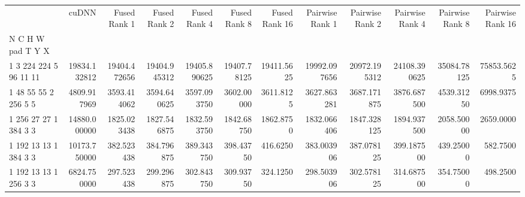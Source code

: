 \begin{tabular}{lrrrrrrrrrrr}
\toprule
{} &         cuDNN &   Fused Rank 1 &   Fused Rank 2 &   Fused Rank 4 &   Fused Rank 8 &   Fused Rank 16 &   Pairwise Rank 1 &   Pairwise Rank 2 &   Pairwise Rank 4 &   Pairwise Rank 8 &   Pairwise Rank 16 \\
N C H W pad T Y X      &               &                &                &                &                &                 &                   &                   &                   &                   &                    \\
\midrule
1 3 224 224 5 96 11 11 &  19834.132812 &   19404.472656 &   19404.945312 &   19405.890625 &    19407.78125 &      19411.5625 &      19992.097656 &      20972.195312 &      24108.390625 &       35084.78125 &         75853.5625 \\
1 48 55 55 2 256 5 5   &   4809.917969 &    3593.414062 &    3594.640625 &    3597.093750 &     3602.00000 &       3611.8125 &       3627.863281 &       3687.171875 &       3876.687500 &        4539.31250 &          6998.9375 \\
1 256 27 27 1 384 3 3  &  14880.000000 &    1825.023438 &    1827.546875 &    1832.593750 &     1842.68750 &       1862.8750 &       1832.066406 &       1847.328125 &       1894.937500 &        2058.50000 &          2659.0000 \\
1 192 13 13 1 384 3 3  &  10173.750000 &     382.523438 &     384.796875 &     389.343750 &      398.43750 &        416.6250 &        383.003906 &        387.078125 &        399.187500 &         439.25000 &           582.7500 \\
1 192 13 13 1 256 3 3  &   6824.750000 &     297.523438 &     299.296875 &     302.843750 &      309.93750 &        324.1250 &        298.503906 &        302.578125 &        314.687500 &         354.75000 &           498.2500 \\
\bottomrule
\end{tabular}
